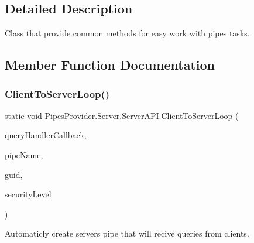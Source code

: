 \subsection{Detailed Description}
Class that provide common methods for easy work with pipes\textquotesingle{} tasks. 



\subsection{Member Function Documentation}
\mbox{\label{class_pipes_provider_1_1_server_1_1_server_a_p_i_a19601974715333ee85506d4abd322515}} 
\subsubsection{\texorpdfstring{Client\+To\+Server\+Loop()}{ClientToServerLoop()}\hspace{0.1cm}{\footnotesize\ttfamily [1/4]}}
{\footnotesize\ttfamily static void Pipes\+Provider.\+Server.\+Server\+A\+P\+I.\+Client\+To\+Server\+Loop (\begin{DoxyParamCaption}\item[{System.\+Action$<$ \mbox{\hyperlink{class_pipes_provider_1_1_server_1_1_server_transmission_controller}{Server\+Transmission\+Controller}}, string $>$}]{query\+Handler\+Callback,  }\item[{string}]{pipe\+Name,  }\item[{out string}]{guid,  }\item[{\mbox{\hyperlink{namespace_pipes_provider_1_1_security_a1a6020eca1c661a6f7140e8260502d7e}{Security.\+Security\+Level}}}]{security\+Level }\end{DoxyParamCaption})\hspace{0.3cm}{\ttfamily [static]}}



Automaticly create server\textquotesingle{}s pipe that will recive queries from clients. 


